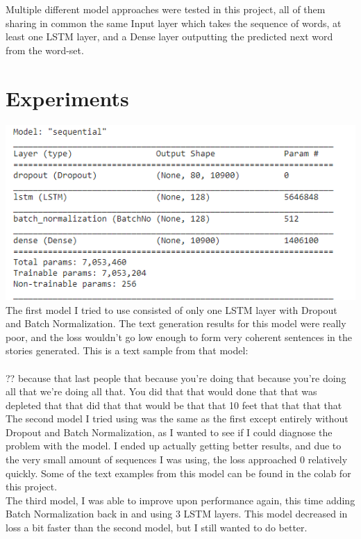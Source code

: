 \documentclass[a4paper]{article}
\begin{document}
\noindent
Multiple different model approaches were tested in this project, all of them sharing in common the same Input layer which takes the sequence of words, at least one LSTM layer, and a Dense layer outputting the predicted next word from the word-set.

\section{Experiments}
\includegraphics{model1}
The first model I tried to use consisted of only one LSTM layer with Dropout and Batch Normalization. The text generation results for this model were really poor, and the loss wouldn't go low enough to form very coherent sentences in the stories generated. This is a text sample from that model: \\ \\
?? because that last people that because you're doing that because you're doing all that we're doing all that. You did that that would done that that was depleted that that did that that would be that that 10 feet that that that that
\\
The second model I tried using was the same as the first except entirely without Dropout and Batch Normalization, as I wanted to see if I could diagnose the problem with the model. I ended up actually getting better results, and due to the very small amount of sequences I was using, the loss approached 0 relatively quickly. Some of the text examples from this model can be found in the colab for this project.
\\
The third model, I was able to improve upon performance again, this time adding Batch Normalization back in and using 3 LSTM layers. This model decreased in loss a bit faster than the second model, but I still wanted to do better.
\\
\end{document}
